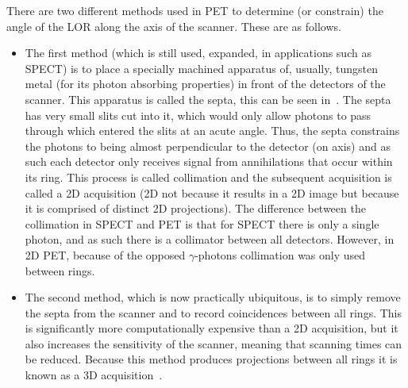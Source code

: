                 There are two different methods used in \gls{PET} to determine (or constrain) the angle of the \gls{LOR} along the axis of the scanner. These are as follows.
                
                \begin{itemize}
                    \item The first method (which is still used, expanded, in applications such as \gls{SPECT}) is to place a specially machined apparatus of, usually, tungsten metal (for its photon absorbing properties) in front of the detectors of the scanner. This apparatus is called the septa, this can be seen in~. The septa has very small slits cut into it, which would only allow photons to pass through which entered the slits at an acute angle. Thus, the septa constrains the photons to being almost perpendicular to the detector (on axis) and as such each detector only receives signal from annihilations that occur within its ring. This process is called collimation and the subsequent acquisition is called a \gls{2D} acquisition (\gls{2D} not because it results in a \gls{2D} image but because it is comprised of distinct \gls{2D} projections). The difference between the collimation in \gls{SPECT} and \gls{PET} is that for \gls{SPECT} there is only a single photon, and as such there is a collimator between all detectors. However, in \gls{2D} \gls{PET}, because of the opposed $\gamma$-photons collimation was only used between rings.
                    
                    \item The second method, which is now practically ubiquitous, is to simply remove the septa from the scanner and to record coincidences between all rings. This is significantly more computationally expensive than a \gls{2D} acquisition, but it also increases the sensitivity of the scanner, meaning that scanning times can be reduced. Because this method produces projections between all rings it is known as a \gls{3D} acquisition~\parencite{Schmitz2013, Bailey1998ExperienceTomographs}.
                \end{itemize}
            
